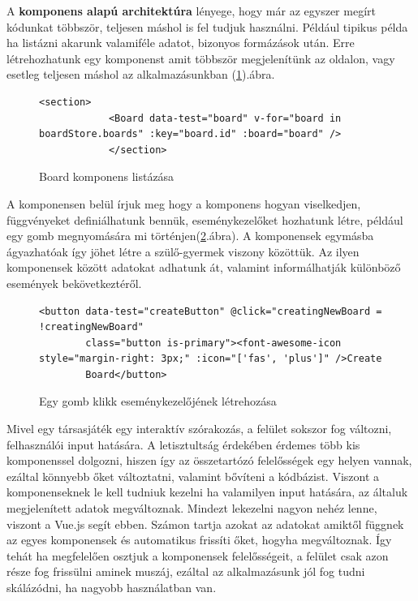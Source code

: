 \documentclass[a4paper,twoside]{article}
\begin{document}
 A \textbf{komponens alapú architektúra} lényege, hogy már az egyszer megírt kódunkat többször, teljesen máshol is fel tudjuk használni. Például tipikus példa 
ha listázni akarunk valamiféle adatot, bizonyos formázások után. Erre létrehozhatunk egy komponenst amit többször megjelenítünk az oldalon, vagy esetleg teljesen máshol az alkalmazásunkban (\ref{komponens}).ábra.
\begin{figure}
	\caption{Board komponens listázása}
	
	\begin{minipage}{\textwidth}
		\begin{lstlisting}[style=javascriptStyle]
			<section>
			<Board data-test="board" v-for="board in boardStore.boards" :key="board.id" :board="board" />
			</section>
		\end{lstlisting}
	\end{minipage}
	
	\label{komponens}
\end{figure}
\FloatBarrier
A komponensen belül írjuk meg hogy a komponens hogyan viselkedjen, függvényeket definiálhatunk bennük, eseménykezelőket hozhatunk létre, például egy gomb megnyomására mi történjen(\ref{button-click}.ábra). A komponensek egymásba ágyazhatóak így jöhet létre a szülő-gyermek viszony közöttük. Az ilyen komponensek között adatokat adhatunk át, valamint informálhatják különböző események bekövetkeztéről. 
\begin{figure}
	\caption{Egy gomb klikk eseménykezelőjének létrehozása}
	\begin{minipage}{\textwidth}
		\begin{lstlisting}[style=javascriptStyle]
		<button data-test="createButton" @click="creatingNewBoard = !creatingNewBoard"
		class="button is-primary"><font-awesome-icon style="margin-right: 3px;" :icon="['fas', 'plus']" />Create
		Board</button>
		\end{lstlisting}
	\end{minipage}
	\label{button-click}
\end{figure}

Mivel egy társasjáték egy interaktív szórakozás, a felület sokszor fog változni, felhasználói input hatására. A letisztultság érdekében érdemes több kis komponenssel dolgozni, hiszen így az összetartózó felelősségek egy helyen vannak, ezáltal könnyebb őket változtatni, valamint bővíteni a kódbázist. Viszont a komponenseknek le kell tudniuk kezelni ha valamilyen input hatására, az általuk megjelenített adatok megváltoznak. Mindezt lekezelni nagyon nehéz lenne, viszont a Vue.js segít ebben. Számon tartja azokat az adatokat amiktől függnek az egyes komponensek és automatikus frissíti őket, hogyha megváltoznak. Így tehát ha megfelelően osztjuk a komponensek felelősségeit, a felület csak azon része fog frissülni aminek muszáj, ezáltal az alkalmazásunk jól fog tudni skálázódni, ha nagyobb használatban van. 
\end{document}
